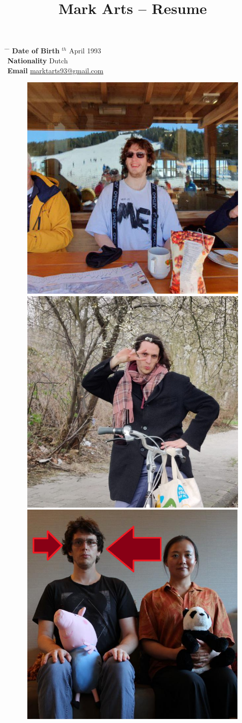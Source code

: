 \documentclass[10pt]{article} %
\begin{document}

\title{Mark Arts -- Resume} %


\parbox{0.5\textwidth}{ %
\begin{tabbing} %
\hspace{3cm} \= \hspace{4cm} \= \kill %
{\bf Date of Birth} $^{th}$ April 1993 \\ %
{\bf Nationality} \> Dutch \\%
{\bf Email} \> \href{mailto:marktarts93@gmail.com}{marktarts93@gmail.com} \\ %
\end{tabbing}}


\begin{figure}[ht]
  \includegraphics[width=0.33\linewidth]{1.jpg}
  \includegraphics[width=0.33\linewidth]{2.jpg}
  \includegraphics[width=0.33\linewidth]{3.png}
\end{figure}
\end{document}

